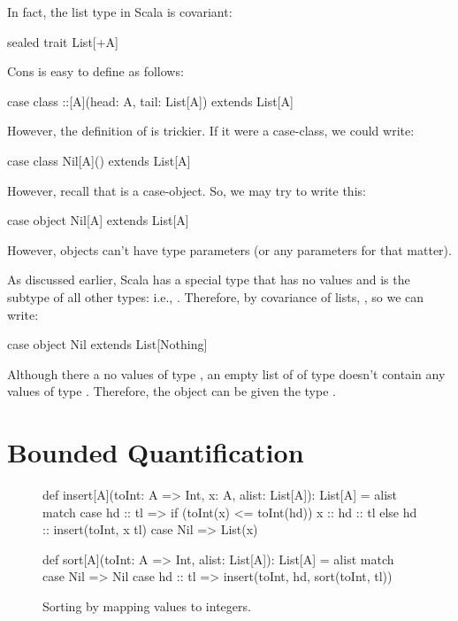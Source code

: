 \documentclass{book}
\begin{document}
In fact, the list type in Scala is covariant:
%
\begin{scalacode}
sealed trait List[+A]
\end{scalacode}
Cons is easy to define as follows:
\begin{scalacode}
case class ::[A](head: A, tail: List[A]) extends List[A]
\end{scalacode}
However, the definition of  is trickier. If it were a case-class,
we could write:
\begin{scalacode}
case class Nil[A]() extends List[A]
\end{scalacode}
However, recall that  is a case-object. So, we may try to
write this:
\begin{scalacode}
case object Nil[A] extends List[A]
\end{scalacode}
However, objects can't have type parameters (or any parameters for that matter).

As discussed earlier, Scala has a special type  that has no values
and is the subtype of all other types: i.e.,
. Therefore, by covariance of lists, , so
we can write:
\begin{scalacode}
case object Nil extends List[Nothing]
\end{scalacode}
Although there a no values of type , an empty list of
of type  doesn't contain any values of type .
Therefore, the  object can be given the type .


\newlecture


\section{Bounded Quantification}

\begin{figure}
\begin{scalacode}
def insert[A](toInt: A => Int, x: A, alist: List[A]): List[A] = alist match {
  case hd :: tl => if (toInt(x) <= toInt(hd)) { x :: hd :: tl } else { hd :: insert(toInt, x tl) }
  case Nil => List(x)
}

def sort[A](toInt: A => Int, alist: List[A]): List[A] = alist match {
  case Nil => Nil
  case hd :: tl => insert(toInt, hd, sort(toInt, tl))
}
\end{scalacode}
\caption{Sorting by mapping values to integers.}
\label{sortToIntHOF}
\end{figure}
\end{document}
